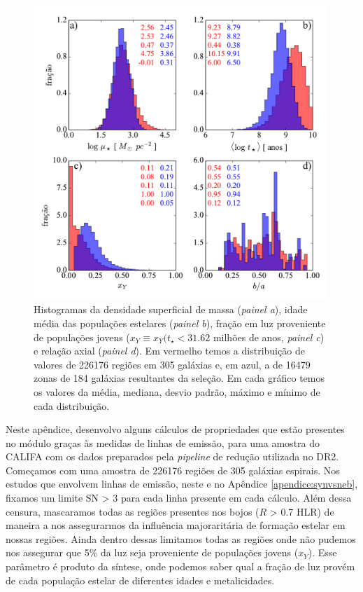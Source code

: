 \begin{figure}
	\centering
	\includegraphics[width=0.99\textwidth]{figuras/histosample.pdf}
	\caption[Histogramas: densidade superficial de massa, idade média, fração de populações jovens e
	relação axial.]
	{Histogramas da densidade superficial de massa ({\em painel a}), idade média das populações
estelares ({\em painel b}), fração em luz proveniente de populações jovens ($x_Y \equiv x_Y(t_\star <
31.62$ milhões de anos, {\em painel c}) e relação axial ({\em painel d}). Em vermelho temos a
distribuição de valores de 226176 regiões em 305 galáxias e, em azul, a de 16479 zonas de 184
galáxias resultantes da seleção. Em cada gráfico temos os valores da média, mediana, desvio padrão,
máximo e mínimo de cada distribuição.}
	\label{fig:histosample}
\end{figure}

Neste apêndice, desenvolvo alguns cálculos de propriedades que estão presentes no módulo \emldc graças às medidas de linhas de emissão, para uma amostra do CALIFA com os dados preparados pela {\em pipeline} de redução utilizada no DR2. Começamos com uma amostra de 226176 regiões de 305 galáxias espirais. Nos estudos que envolvem linhas de emissão, neste e no Apêndice \ref{apendice:synvsneb}, fixamos um limite SN > 3 para cada linha presente em cada cálculo. Além dessa censura, mascaramos todas as regiões presentes nos bojos ($R$ > 0.7 HLR) de maneira a nos assegurarmos da influência majoraritária de formação estelar em nossas regiões. Ainda dentro dessas limitamos todas as regiões onde não pudemos nos assegurar que 5\% da luz seja proveniente de populações jovens ($x_Y$). Esse parâmetro é produto da síntese, onde podemos saber qual a fração de luz provém de cada população estelar de diferentes idades e metalicidades.

